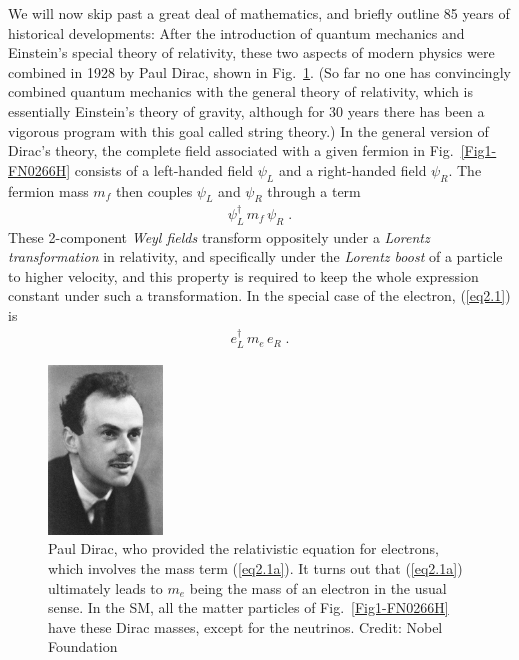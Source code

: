 \documentclass[12pt]{iopart}
\begin{document}
We will now skip past a great deal of mathematics, and briefly outline 85 years of historical developments: After the introduction of quantum mechanics and Einstein's special theory of relativity, these two aspects of modern physics were combined in 1928 by Paul Dirac, shown in Fig.~\ref{Fig7a-Dirac.eps}. (So far no one has convincingly combined quantum mechanics with the general theory of relativity, which is essentially Einstein's theory of gravity, although for 30 years there has been a vigorous program with this goal called string theory.) In the general version of Dirac's theory, the complete field associated with a given fermion in Fig.~\ref{Fig1-FN0266H} consists of a left-handed field $\psi _{L}$ and a right-handed field $\psi _{R}$. The fermion mass $m_{f}$ then couples $\psi _{L}$ and $\psi _{R}$ through a term
\begin{eqnarray}
\psi _{L}^{\dag }\,m_{f}\,\psi _{R} \; .
\label{eq2.1}
\end{eqnarray}
These 2-component \textit{Weyl fields} transform oppositely under a \textit{Lorentz transformation} in relativity, and specifically under the \textit{Lorentz boost} of a particle to higher velocity, and this property is required to keep the whole expression constant under such a transformation. In the special case of the electron,  (\ref{eq2.1}) is
\begin{eqnarray}
e_{L}^{\dag }\,m_{e}\,e_{R} \; .
\label{eq2.1a}
\end{eqnarray}
\begin{figure}[htbp]
\centering
 \includegraphics[bb=0 0 120 540, width=1.2in]{Fig7a-Dirac.eps}
 \caption{Paul Dirac, who provided the relativistic equation for electrons, which involves the mass term (\ref{eq2.1a}). It turns out that (\ref{eq2.1a}) ultimately leads to $m_{e}$ being the mass of an electron in the usual sense. In the SM, all the matter particles of  Fig.~\ref{Fig1-FN0266H} have these Dirac masses, except for the neutrinos. Credit: Nobel Foundation \label{Fig7a-Dirac.eps}}
 \end{figure}
\end{document}
